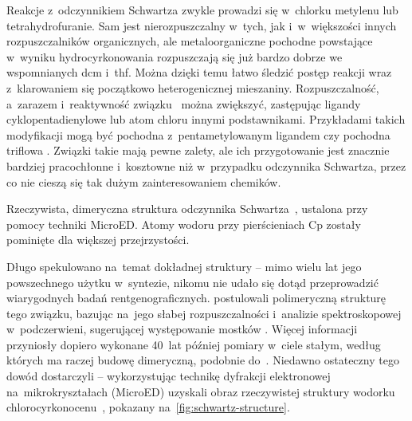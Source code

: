 Reakcje z~odczynnikiem Schwartza zwykle prowadzi się w~chlorku metylenu lub tetrahydrofuranie.
Sam \schwartz{} jest nierozpuszczalny w~tych, jak i~w~większości innych rozpuszczalników
  organicznych, ale metaloorganiczne pochodne powstające w~wyniku hydrocyrkonowania
  rozpuszczają się już bardzo dobrze we wspomnianych \acrshort{dcm} i~\acrshort{thf}.
Można dzięki temu łatwo śledzić postęp reakcji wraz z~klarowaniem się początkowo
  heterogenicznej mieszaniny.
Rozpuszczalność, a~zarazem i~reaktywność związku~ można zwiększyć,
  zastępując ligandy cyklopentadienylowe lub atom chloru innymi podstawnikami.
Przykładami takich modyfikacji mogą być pochodna z~pentametylowanym ligandem
  \ch{[(Cp^*)2Zr(H)Cl]} czy pochodna triflowa
  \ch{[Cp2Zr(H)OTf]}.
Związki takie mają pewne zalety, ale ich przygotowanie jest znacznie bardziej
  pracochłonne i~kosztowne niż w~przypadku odczynnika Schwartza,
  przez co nie cieszą się tak dużym zainteresowaniem chemików.

\begin{marginfigure}
  
  \caption{
    Rzeczywista, dimeryczna struktura odczynnika Schwartza~,
    ustalona przy pomocy techniki MicroED.
    Atomy wodoru przy pierścieniach Cp zostały pominięte dla większej przejrzystości.
  }
  \label{fig:schwartz-structure}
\end{marginfigure}
  Długo spekulowano na~temat dokładnej struktury \schwartz{} \---
  mimo wielu lat jego powszechnego użytku w~syntezie, nikomu nie udało się dotąd
  przeprowadzić wiarygodnych badań rentgenograficznych.
\citeauthor{wailes70} postulowali polimeryczną strukturę tego związku,
  bazując na~jego słabej rozpuszczalności i~analizie spektroskopowej w~podczerwieni,
  sugerującej występowanie mostków .
Więcej informacji przyniosły dopiero wykonane 40~lat później pomiary 
  w~ciele stałym, według których  ma raczej budowę dimeryczną,
  podobnie do~\ch{[Cp2Zr(H)Me]}.
Niedawno ostateczny tego dowód dostarczyli \citeauthor{jones19} \---
  wykorzystując technikę dyfrakcji elektronowej na~mikrokryształach (MicroED) uzyskali
  obraz rzeczywistej struktury wodorku chlorocyrkonocenu~,
  pokazany na~\cref{fig:schwartz-structure}.


